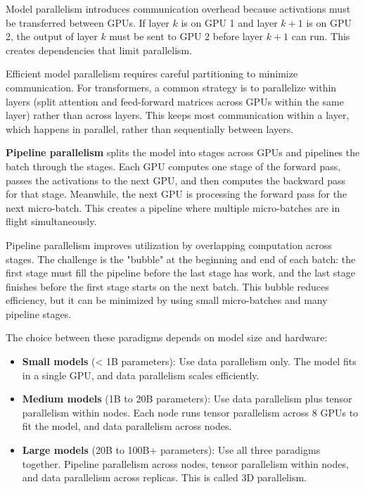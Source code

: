 Model parallelism introduces communication overhead because activations must be transferred between GPUs. If layer $k$ is on GPU 1 and layer $k+1$ is on GPU 2, the output of layer $k$ must be sent to GPU 2 before layer $k+1$ can run. This creates dependencies that limit parallelism.

Efficient model parallelism requires careful partitioning to minimize communication. For transformers, a common strategy is to parallelize within layers (split attention and feed-forward matrices across GPUs within the same layer) rather than across layers. This keeps most communication within a layer, which happens in parallel, rather than sequentially between layers.

\textbf{Pipeline parallelism} splits the model into stages across GPUs and pipelines the batch through the stages. Each GPU computes one stage of the forward pass, passes the activations to the next GPU, and then computes the backward pass for that stage. Meanwhile, the next GPU is processing the forward pass for the next micro-batch. This creates a pipeline where multiple micro-batches are in flight simultaneously.

Pipeline parallelism improves utilization by overlapping computation across stages. The challenge is the "bubble" at the beginning and end of each batch: the first stage must fill the pipeline before the last stage has work, and the last stage finishes before the first stage starts on the next batch. This bubble reduces efficiency, but it can be minimized by using small micro-batches and many pipeline stages.

The choice between these paradigms depends on model size and hardware:

\begin{itemize}
\item \textbf{Small models} (< 1B parameters): Use data parallelism only. The model fits in a single GPU, and data parallelism scales efficiently.

\item \textbf{Medium models} (1B to 20B parameters): Use data parallelism plus tensor parallelism within nodes. Each node runs tensor parallelism across 8 GPUs to fit the model, and data parallelism across nodes.

\item \textbf{Large models} (20B to 100B+ parameters): Use all three paradigms together. Pipeline parallelism across nodes, tensor parallelism within nodes, and data parallelism across replicas. This is called 3D parallelism.
\end{itemize}

